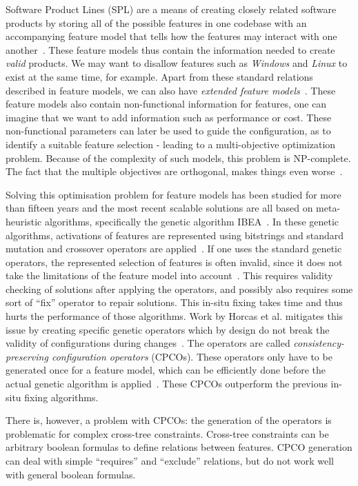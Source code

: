 Software Product Lines (SPL) are a means of creating closely related software
products by storing all of the possible features in one codebase with an
accompanying feature model that tells how the features may interact with one
another~\cite{apel2016spl, kang1990fms}. These feature models thus contain the
information needed to create \emph{valid} products. We may want to disallow
features such as \emph{Windows} and \emph{Linux} to exist at the same time, for
example. Apart from these standard relations described in feature models, we
can also have \emph{extended feature models}~\cite{benavides2005extfms}. These
feature models also contain non-functional information for features, one can
imagine that we want to add information such as performance or cost. These
non-functional parameters can later be used to guide the configuration, as to
identify a suitable feature selection - leading to a multi-objective 
optimization problem. Because
of the complexity of such models, this problem is NP-complete. The fact that
the multiple objectives are orthogonal, makes things even worse~\cite{ochoa2018npcomplete}. 

Solving this optimisation problem for feature models has been studied for more
than fifteen years and the most recent scalable solutions are all based on
meta-heuristic algorithms, specifically the genetic algorithm
IBEA~\cite{horcas2022breakit, zitzler2004ibea}. In these genetic algorithms,
activations of features are represented using bitstrings and standard mutation
and crossover operators are applied~\cite{ochoa2018npcomplete}. If one uses the
standard genetic operators, the represented selection of features is often
invalid, since it does not take the limitations of the feature model into
account~\cite{henard2015satibea, pascual2015modagame}. This requires validity
checking of solutions after applying the operators, and possibly also requires
some sort of ``fix'' operator to repair solutions. This in-situ fixing takes
time and thus hurts the performance of those algorithms. Work by Horcas et al.
mitigates this issue by creating specific genetic operators which by design do not break
the validity of configurations during changes~\cite{horcas2022breakit}. The
operators are called \emph{consistency-preserving configuration operators}
(CPCOs). These operators only have to be generated once for a feature model,
which can be efficiently done before the actual genetic algorithm is
applied~\cite{horcas2022breakit}. These CPCOs outperform the previous in-situ
fixing algorithms.

There is, however, a problem with CPCOs: the generation of
the operators is problematic for complex cross-tree constraints. Cross-tree 
constraints can be arbitrary boolean formulas to define relations between
features. CPCO generation can deal with simple ``requires'' and ``exclude'' relations,
but do not work well with general boolean formulas.

